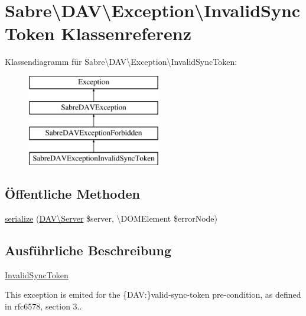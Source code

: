 \hypertarget{class_sabre_1_1_d_a_v_1_1_exception_1_1_invalid_sync_token}{}\section{Sabre\textbackslash{}D\+AV\textbackslash{}Exception\textbackslash{}Invalid\+Sync\+Token Klassenreferenz}
\label{class_sabre_1_1_d_a_v_1_1_exception_1_1_invalid_sync_token}
Klassendiagramm für Sabre\textbackslash{}D\+AV\textbackslash{}Exception\textbackslash{}Invalid\+Sync\+Token\+:\begin{figure}[H]
\begin{center}
\leavevmode
\includegraphics[height=4.000000cm]{class_sabre_1_1_d_a_v_1_1_exception_1_1_invalid_sync_token}
\end{center}
\end{figure}
\subsection*{Öffentliche Methoden}
\begin{DoxyCompactItemize}
\item 
\mbox{\hyperlink{class_sabre_1_1_d_a_v_1_1_exception_1_1_invalid_sync_token_ab014ed2b556cd17adef21e8eaf38a3c8}{serialize}} (\mbox{\hyperlink{class_sabre_1_1_d_a_v_1_1_server}{D\+A\+V\textbackslash{}\+Server}} \$server, \textbackslash{}D\+O\+M\+Element \$error\+Node)
\end{DoxyCompactItemize}


\subsection{Ausführliche Beschreibung}
\mbox{\hyperlink{class_sabre_1_1_d_a_v_1_1_exception_1_1_invalid_sync_token}{Invalid\+Sync\+Token}}

This exception is emited for the \{D\+AV\+:\}valid-\/sync-\/token pre-\/condition, as defined in rfc6578, section 3..

